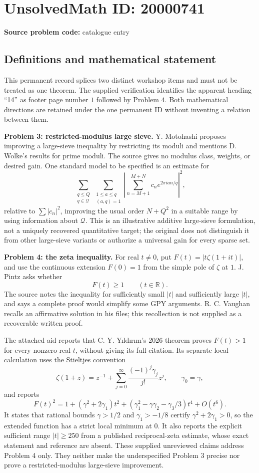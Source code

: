 \documentclass[11pt]{article}
\newcommand{\R}{\mathbb{R}}
\begin{document}
\section*{UnsolvedMath ID: 20000741}
\textbf{Source problem code:} catalogue entry
\subsection{Definitions and mathematical statement}
This permanent record splices two distinct workshop items and must not be treated as one theorem. The supplied verification identifies the apparent heading ``14'' as footer page number \(1\) followed by Problem \(4\). Both mathematical directions are retained under the one permanent ID without inventing a relation between them.

\textbf{Problem 3: restricted-modulus large sieve.} Y. Motohashi proposes improving a large-sieve inequality by restricting its moduli and mentions D. Wolke's results for prime moduli. The source gives no modulus class, weights, or desired gain. One standard model to be specified is an estimate for
\[
\sum_{\substack{q\leq Q\\q\in\mathcal Q}}
\sum_{\substack{1\leq a\leq q\\(a,q)=1}}
\left|\sum_{n=M+1}^{M+N}c_ne^{2\pi i an/q}\right|^2,
\]
relative to \(\sum|c_n|^2\), improving the usual order \(N+Q^2\) in a suitable range by using information about \(\mathcal Q\). This is an illustrative additive large-sieve formulation, not a uniquely recovered quantitative target; the original does not distinguish it from other large-sieve variants or authorize a universal gain for every sparse set.

\textbf{Problem 4: the zeta inequality.} For real \(t\ne0\), put \(F(t)=|t\zeta(1+it)|\), and use the continuous extension \(F(0)=1\) from the simple pole of \(\zeta\) at \(1\). J. Pintz asks whether
\[
F(t)\geq1\qquad(t\in\R).
\]
The source notes the inequality for sufficiently small \(|t|\) and sufficiently large \(|t|\), and says a complete proof would simplify some GPY arguments. R. C. Vaughan recalls an affirmative solution in his files; this recollection is not supplied as a recoverable written proof.

The attached aid reports that C. Y. Yıldırım's 2026 theorem proves \(F(t)>1\) for every nonzero real \(t\), without giving its full citation. Its separate local calculation uses the Stieltjes convention
\[
\zeta(1+z)=z^{-1}+\sum_{j=0}^\infty\frac{(-1)^j\gamma_j}{j!}z^j,
\qquad\gamma_0=\gamma,
\]
and reports
\[
F(t)^2=1+(\gamma^2+2\gamma_1)t^2
+(\gamma_1^2-\gamma\gamma_2-\gamma_3/3)t^4+O(t^6).
\]
It states that rational bounds \(\gamma>1/2\) and \(\gamma_1>-1/8\) certify \(\gamma^2+2\gamma_1>0\), so the extended function has a strict local minimum at \(0\). It also reports the explicit sufficient range \(|t|\geq250\) from a published reciprocal-zeta estimate, whose exact statement and reference are absent. These supplied unreviewed claims address Problem 4 only. They neither make the underspecified Problem 3 precise nor prove a restricted-modulus large-sieve improvement.
\end{document}
